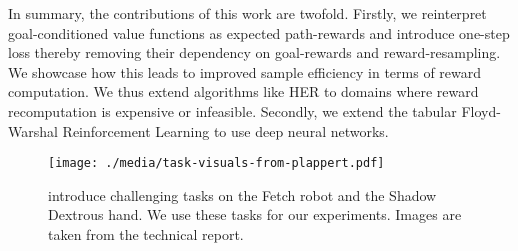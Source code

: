 In summary, the  contributions of this work are twofold. Firstly, we
reinterpret goal-conditioned value functions as expected path-rewards
and introduce one-step loss thereby removing their dependency on
goal-rewards and reward-resampling. We showcase how this leads to
improved sample efficiency in  terms of reward computation. We thus
extend algorithms like HER to domains where reward recomputation is
expensive or infeasible.
Secondly, we extend the tabular Floyd-Warshal Reinforcement Learning to
use deep neural networks. 



%
\begin{figure}%
  \texttt{[image: ./media/task-visuals-from-plappert.pdf]}%
  \caption{\citet{plappert2018multi} introduce challenging tasks on the
Fetch robot and the Shadow Dextrous hand. We use these tasks for our experiments.
    Images are taken from the technical report.}%
  \label{fig:envs}%
\end{figure}%
% 
